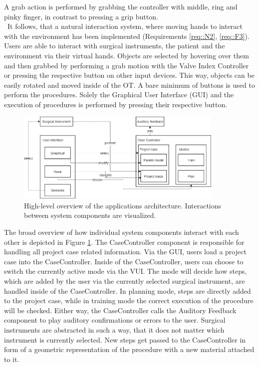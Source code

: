 A grab action is performed by grabbing the controller with middle, ring and pinky finger, in contrast to pressing a grip button.
\\ It follows, that a natural interaction system, where moving hands to interact with the environment has been implemented (Requirements \ref{req::N2}, \ref{req::F3}).
Users are able to interact with surgical instruments, the patient and the environment via their virtual hands.
Objects are selected by hovering over them and then grabbed by performing a grab motion with the Valve Index Controller or pressing the respective button on other input devices.
This way, objects can be easily rotated and moved inside of the OT.
A bare minimum of buttons is used to perform the procedures.
Solely the Graphical User Interface (GUI) and the execution of procedures is performed by pressing their respective button.

\begin{figure}[ht]
    \centering
    \includegraphics[width=375px]{images/implementation/architecture.png}
    \caption{\label{fig::ImplementationArchitecture}High-level overview of the applications architecture. Interactions between system components are visualized.}
\end{figure}

The broad overview of how individual system components interact with each other is depicted in Figure \ref{fig::ImplementationArchitecture}.
The CaseController component is responsible for handling all project case related information.
Via the GUI, users load a project case into the CaseController.
Inside of the CaseController, users can choose to switch the currently active mode via the VUI.
The mode will decide how steps, which are added by the user via the currently selected surgical instrument, are handled inside of the CaseController.
In planning mode, steps are directly added to the project case, while in training mode the correct execution of the procedure will be checked.
Either way, the CaseController calls the Auditory Feedback component to play auditory confirmations or errors to the user.
Surgical instruments are abstracted in such a way, that it does not matter which instrument is currently selected.
New steps get passed to the CaseController in form of a geometric representation of the procedure with a new material attached to it.
